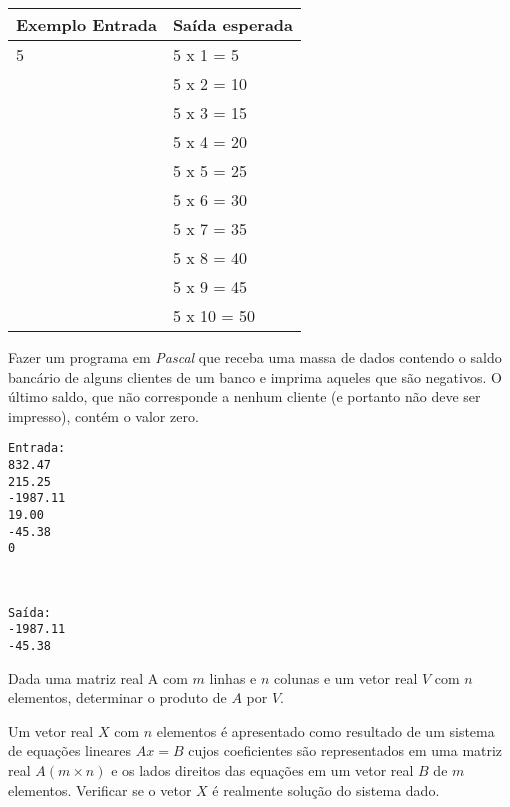 \begin{center}
\begin{tabular}{|l|l|} \hline
Exemplo Entrada & Saída esperada \\ \hline
5               & 5 x 1 = 5 \\
                & 5 x 2 = 10 \\
                & 5 x 3 = 15 \\
                & 5 x 4 = 20 \\
                & 5 x 5 = 25 \\
                & 5 x 6 = 30 \\
                & 5 x 7 = 35 \\
                & 5 x 8 = 40 \\
                & 5 x 9 = 45 \\
                & 5 x 10 = 50 \\ \hline
\end{tabular}
\end{center}
\item Fazer um programa em \emph{Pascal} que receba uma massa de dados
contendo o saldo bancário de alguns clientes de um banco
e imprima aqueles que são negativos. O último saldo, que não corresponde
a nenhum cliente (e portanto  não deve ser impresso), contém o valor
zero.

\begin{minipage}{5cm}
\begin{verbatim}
Entrada:
832.47
215.25
-1987.11
19.00
-45.38
0
\end{verbatim}
\end{minipage} \
\begin{minipage}{5cm}
\begin{verbatim}
Saída:
-1987.11
-45.38
\end{verbatim}
\end{minipage}


\item Dada uma matriz real A com $m$ linhas e $n$ colunas e um vetor real $V$ 
com $n$ elementos, determinar o produto  de $A$ por $V$. 

\item Um  vetor real $X$ com $n$  elementos é apresentado como  resultado 
de um sistema de  equações lineares $Ax=B$ cujos  coeficientes são representados
em uma  matriz real $A  (m \times n)$  e os lados  direitos das equações  em um
vetor real $B$ de $m$ elementos.  Verificar se o vetor $X$ é realmente solução
do sistema dado. 


